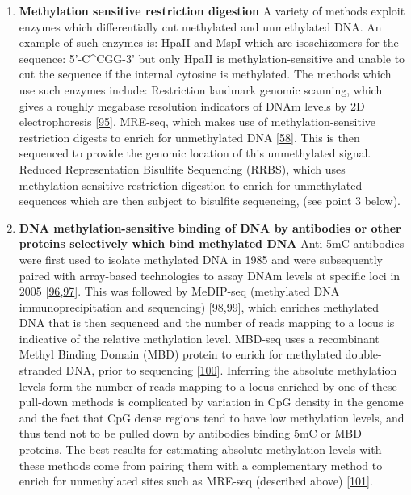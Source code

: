 \documentclass[
]{book}
\begin{document}
\begin{enumerate}
\def\labelenumi{\arabic{enumi}.}
\item
  \textbf{Methylation sensitive restriction digestion}
  A variety of methods exploit enzymes which differentially cut methylated and unmethylated DNA.
  An example of such enzymes is: HpaII and MspI which are isoschizomers for the sequence: 5'-C\^{}CGG-3' but only HpaII is methylation-sensitive and unable to cut the sequence if the internal cytosine is methylated.
  The methods which use such enzymes include: Restriction landmark genomic scanning, which gives a roughly megabase resolution indicators of DNAm levels by 2D electrophoresis {[}\protect\hyperlink{ref-Hatada1991}{95}{]}.
  MRE-seq, which makes use of methylation-sensitive restriction digests to enrich for unmethylated DNA {[}\protect\hyperlink{ref-Maunakea2010}{58}{]}.
  This is then sequenced to provide the genomic location of this unmethylated signal.
  Reduced Representation Bisulfite Sequencing (RRBS), which uses methylation-sensitive restriction digestion to enrich for unmethylated sequences which are then subject to bisulfite sequencing, (see point 3 below).
\item
  \textbf{DNA methylation-sensitive binding of DNA by antibodies or other proteins selectively which bind methylated DNA}
  Anti-5mC antibodies were first used to isolate methylated DNA in 1985 and were subsequently paired with array-based technologies to assay DNAm levels at specific loci in 2005 {[}\protect\hyperlink{ref-Weber2005}{96},\protect\hyperlink{ref-Harrison2011}{97}{]}.
  This was followed by MeDIP-seq (methylated DNA immunoprecipitation and sequencing) {[}\protect\hyperlink{ref-Down2009}{98},\protect\hyperlink{ref-Lienhard2014}{99}{]}, which enriches methylated DNA that is then sequenced and the number of reads mapping to a locus is indicative of the relative methylation level.
  MBD-seq uses a recombinant Methyl Binding Domain (MBD) protein to enrich for methylated double-stranded DNA, prior to sequencing {[}\protect\hyperlink{ref-Serre2009a}{100}{]}.
  Inferring the absolute methylation levels form the number of reads mapping to a locus enriched by one of these pull-down methods is complicated by variation in CpG density in the genome and the fact that CpG dense regions tend to have low methylation levels, and thus tend not to be pulled down by antibodies binding 5mC or MBD proteins.
  The best results for estimating absolute methylation levels with these methods come from pairing them with a complementary method to enrich for unmethylated sites such as MRE-seq (described above) {[}\protect\hyperlink{ref-Li2015}{101}{]}.

\end{enumerate}
\end{document}
